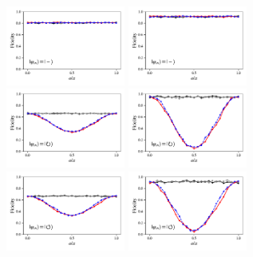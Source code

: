 \documentclass[a4paper]{article}
\begin{document}
\begin{figure}[H]
	\\
	\includegraphics[width=0.35\textwidth]{fidelity_qc2_mit1_state3}
	\includegraphics[width=0.35\textwidth]{fidelity_qc2_mit0_state3}
	\\
	\includegraphics[width=0.35\textwidth]{fidelity_qc2_mit1_state4}
	\includegraphics[width=0.35\textwidth]{fidelity_qc2_mit0_state4}
	\\
	\includegraphics[width=0.35\textwidth]{fidelity_qc2_mit1_state5}
	\includegraphics[width=0.35\textwidth]{fidelity_qc2_mit0_state5}
\end{figure}
\end{document}

